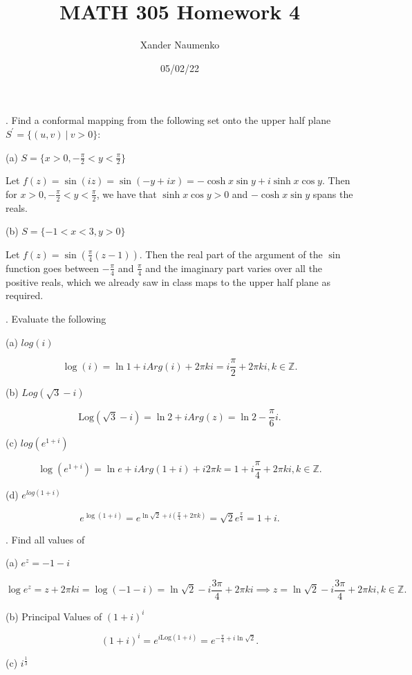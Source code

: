 \documentclass[letterpaper, reqno,11pt]{article}
\begin{document}
\title{MATH 305 Homework 4}
\date{05/02/22}
\author{Xander Naumenko}
\maketitle

. Find a conformal mapping from the following set onto the upper half plane $ S^{'}=\{(u,v) \ | \ v>0\}$:

(a) $ S= \{  x>0, -\frac{\pi}{2}<y<\frac{\pi}{2} \}$

Let $f(z)=\sin(iz)=\sin(-y+ix)=-\cosh x\sin y+i\sinh x\cos y$. Then for $x>0, -\frac{\pi}{2}<y<\frac{\pi}{2}$, we have that $\sinh x\cos y>0$ and $-\cosh x\sin y$ spans the reals. 

(b) $ S= \{ -1<x<3, y>0\}$

Let $f(z)=\sin\left( \frac{\pi}{4}(z-1) \right) $. Then the real part of the argument of the $\sin$ function goes between $-\frac{\pi}{4}$ and $\frac{\pi}{4}$ and the imaginary part varies over all the positive reals, which we already saw in class maps to the upper half plane as required. 

. Evaluate the following

(a) $log (i)$

\[
\log(i)=\ln 1+iArg(i)+2\pi ki=i\frac{\pi}{2}+2\pi ki, k\in\mathbb{Z}
.\]

(b) $Log (\sqrt{3}-i)$

\[
\text{Log}(\sqrt{3} -i)=\ln 2+iArg(z)=\ln 2-\frac{\pi}{6}i
.\]

(c)  $ log ( e^{1+i})$

\[
\log(e^{1+i})=\ln e+iArg(1+i)+i 2\pi k=1+i\frac{\pi}{4}+2\pi ki, k\in\mathbb{Z}
.\]

(d) $e^{log (1+i)}$

\[
e^{\log(1+i)}=e^{\ln\sqrt{2} +i\left( \frac{\pi}{4}+2\pi k \right) }=\sqrt{2} e^{\frac{\pi}{4}}=1+i
.\]


\medskip

. Find all values of

(a) $ e^z= -1-i$

\[
\log e^{z}=z+2\pi ki=\log(-1-i)=\ln\sqrt{2} -i \frac{3\pi}{4}+2\pi ki\implies z=\ln\sqrt{2} -i \frac{3\pi}{4}+2\pi ki, k\in\mathbb{Z}
.\]

(b) Principal Values of $ (1+i)^{i}$

\[
    (1+i)^{i}=e^{i\text{Log}(1+i)}=e^{-\frac{\pi}{4}+i\ln \sqrt{2} }
.\]

(c) $i^{\frac{1}{3}}$
\end{document}
